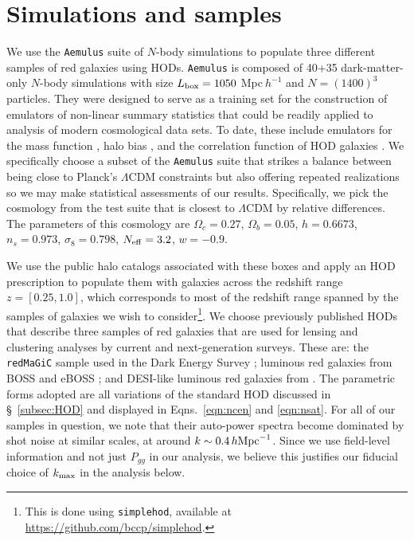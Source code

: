 \documentclass[fleqn,usenatbib]{mnras}
\newcommand{\redmagic}{\texttt{redMaGiC} }
\newcommand{\ihmpc}{\,h{\rm Mpc}^{-1}}
\newcommand{\aemulus}{\texttt{Aemulus} }
\newcommand{\kmax}{k_{\rm max}}
\begin{document}
\section{Simulations and samples}
\label{sec:simsnsamples}
We use the \texttt{Aemulus} \citep{DeRose:2018xdj} suite of $N$-body simulations to populate three different samples of red galaxies using HODs. \texttt{Aemulus} is composed of 40+35 dark-matter-only $N$-body simulations with size $L_{\rm box} = 1050$ Mpc$~h^{-1}$ and $N=(1400)^3$ particles. They were designed to serve as a training set for the construction of emulators of non-linear summary statistics that could be readily applied to analysis of modern cosmological data sets. To date, these include emulators for the mass function \citep{McClintock:2018uyf}, halo bias \citep{mcclintock2019aemulus}, and the correlation function of HOD galaxies \citep{Zhai:2018plk}. We specifically choose a subset of the \aemulus suite that strikes a balance between being close to Planck's $\Lambda$CDM constraints but also offering repeated realizations so we may make statistical assessments of our results. Specifically, we pick the cosmology from the test suite that is closest to $\Lambda$CDM by relative differences. The parameters of this cosmology are $\Omega_c = 0.27$, $\Omega_b = 0.05$, $h = 0.6673$, $n_s=0.973$, $\sigma_8 = 0.798$, $N_{\rm eff} = 3.2$, $w=-0.9$.\par 
We use the public halo catalogs associated with these boxes and apply an HOD prescription to populate them with galaxies across the redshift range $z=[0.25, 1.0]$, which corresponds to most of the redshift range spanned by the samples of galaxies we wish to consider\footnote{This is done using \texttt{simplehod}, available at \href{https://github.com/bccp/simplehod}{https://github.com/bccp/simplehod}.}. We choose previously published HODs that describe three samples of red galaxies that are used for lensing and clustering analyses by current and next-generation surveys. These are: the \redmagic sample used in the Dark Energy Survey \citep{Rozo:2015mmv,Clampitt_2016, zacharegkas2021dark}; luminous red galaxies from BOSS and eBOSS \citep{Zhai_2017}; and DESI-like luminous red galaxies from \citet{Zhou_2020}. The parametric forms adopted are all variations of the standard \citet{Zheng:2004id,Zheng:2007zg} HOD discussed in \S~\ref{subsec:HOD} and displayed in Eqns.~\ref{eqn:ncen} and \ref{eqn:nsat}. For all of our samples in question, we note that their auto-power spectra become dominated by shot noise at similar scales, at around $k\sim 0.4 \ihmpc$. Since we use field-level information and not just $P_{gg}$ in our analysis, we believe this justifies our fiducial choice of $\kmax$ in the analysis below.\par 
\end{document}

